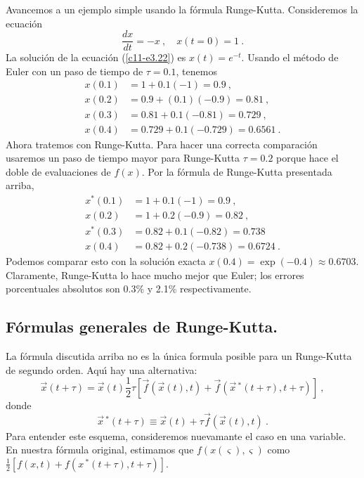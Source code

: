 Avancemos a un ejemplo simple usando la f{\'o}rmula Runge-Kutta. Consideremos
la ecuaci{\'o}n
\begin{equation}
\label{c11-e3.22}
\frac{dx}{dt}=-x\ ,\quad    x(t=0)=1\ .
\end{equation}
La soluci{\'o}n de la ecuaci{\'o}n (\ref{c11-e3.22}) es $x(t)=e^{-t}$. Usando el
m{\'e}todo de Euler con un paso de tiempo de $\tau=0.1$, tenemos
\begin{align*}
x(0.1) &=1+0.1(-1)=0.9\ ,\\
x(0.2) &=0.9+(0.1)(-0.9)=0.81\ , \\
x(0.3) &=0.81+0.1(-0.81)=0.729\ ,\\
x(0.4) &=0.729+0.1(-0.729)=0.6561\ .
\end{align*}
Ahora tratemos con Runge-Kutta. Para hacer una correcta comparaci{\'o}n
usaremos un paso de tiempo mayor para Runge-Kutta $\tau=0.2$ porque hace
el doble de evaluaciones de $f(x)$. Por la f{\'o}rmula de Runge-Kutta
presentada arriba,
\begin{align*}
x^*(0.1) &=1+0.1(-1)=0.9\ ,\\
x(0.2) &=1+0.2(-0.9)=0.82\ ,\\
x^*(0.3)&=0.82+0.1(-0.82)=0.738\, \\
x(0.4)&=0.82+0.2(-0.738)=0.6724\ .
\end{align*}  
Podemos comparar esto con la soluci{\'o}n exacta
$x(0.4)=\exp(-0.4)\approx0.6703$.  Claramente, Runge-Kutta lo hace mucho
mejor que Euler; los errores porcentuales absolutos son 0.3\% y 2.1\%
respectivamente.

\subsection{F{\'o}rmulas generales de Runge-Kutta.}

La f{\'o}rmula discutida arriba no es la {\'u}nica formula posible para un
Runge-Kutta de segundo orden. Aqu{\'\i} hay una alternativa:
\begin{equation}
\label{c11-e3.23}
\vec x(t+\tau)=\vec x(t)  \frac 12 \tau [\vec f(\vec x(t), t)+\vec f(\vec
x\,^*(t+\tau), t+\tau)]\ ,
\end{equation} 
donde
\begin{equation}
\label{c11-e3.24}
\vec x\,^*(t+\tau)\equiv\vec x(t)+\tau\vec f(\vec x(t), t)\ .
\end{equation}
Para entender este esquema, consideremos nuevamante el caso en  una
variable. En nuestra f{\'o}rmula original, estimamos que $f(x(\varsigma),\varsigma)$ como
$\frac 12[f(x,t)+f(x\,^*(t+\tau), t+\tau)]$.

